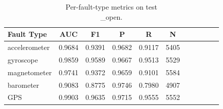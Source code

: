 \begin{table}[htbp]
\centering
\caption{Per-fault-type metrics on test\\_open.}
\label{tab:fault_test_open}
\begin{tabular}{lcccccccccc}
\toprule
Fault Type & AUC & F1 & P & R & N \\
\midrule
accelerometer & 0.9684 & 0.9391 & 0.9682 & 0.9117 & 5405 \\
gyroscope & 0.9859 & 0.9589 & 0.9667 & 0.9513 & 5529 \\
magnetometer & 0.9741 & 0.9372 & 0.9659 & 0.9101 & 5584 \\
barometer & 0.9083 & 0.8775 & 0.9746 & 0.7980 & 4907 \\
GPS & 0.9903 & 0.9635 & 0.9715 & 0.9555 & 5552 \\
\bottomrule
\end{tabular}
\end{table}
